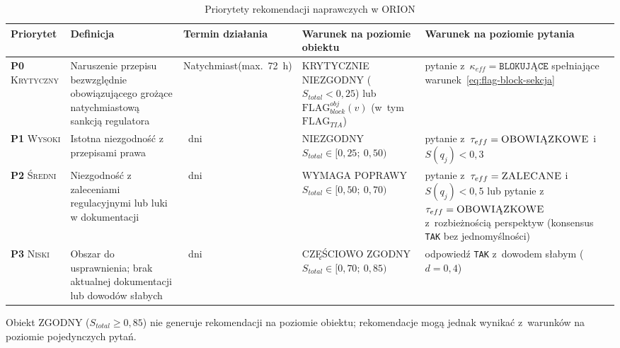 \begin{table}[H]
\centering
\caption{Priorytety rekomendacji naprawczych w ORION}
\label{tab:priorytety}
\renewcommand{\arraystretch}{1.5}
\begin{tabular}{>{\raggedright\arraybackslash}p{2.1cm}>{\raggedright\arraybackslash}p{3.4cm}>{\raggedright\arraybackslash}p{2.0cm}>{\raggedright\arraybackslash}p{3.3cm}>{\raggedright\arraybackslash}p{3.3cm}}
\toprule
\textbf{Priorytet} & \textbf{Definicja}
& \textbf{Termin działania}
& \textbf{Warunek na poziomie obiektu}
& \textbf{Warunek na poziomie pytania} \\
\midrule
\textbf{P0} \newline \textsc{Krytyczny}
& Naruszenie przepisu bezwzględnie obowiązującego
  grożące natychmiastową sankcją regulatora
& Natychmiast\newline(max.\ 72~h)
& \textsc{KRYTYCZNIE NIEZGODNY} ($S_{total} < 0{,}25$)
  lub $\text{FLAG}_{block}^{obj}(v)$ (w~tym $\text{FLAG}_{TIA}$)
& pytanie z~$\kappa_{eff} = \texttt{BLOKUJĄCE}$ spełniające
  warunek~\eqref{eq:flag-block-sekcja} \\
\midrule
\textbf{P1} \newline \textsc{Wysoki}
& Istotna niezgodność z przepisami prawa
& 30~dni
& \textsc{NIEZGODNY}\newline $S_{total} \in [0{,}25;\ 0{,}50)$
& pytanie z~$\tau_{eff} = \textsc{OBOWIĄZKOWE}$
  i~$S(q_j) < 0{,}3$ \\
\midrule
\textbf{P2} \newline \textsc{Średni}
& Niezgodność z zaleceniami regulacyjnymi
  lub luki w dokumentacji
& 90~dni
& \textsc{WYMAGA POPRAWY}\newline $S_{total} \in [0{,}50;\ 0{,}70)$
& pytanie z~$\tau_{eff} = \textsc{ZALECANE}$
  i~$S(q_j) < 0{,}5$ lub pytanie z~$\tau_{eff} = \textsc{OBOWIĄZKOWE}$
  z~rozbieżnością perspektyw (konsensus \texttt{TAK} bez jednomyślności) \\
\midrule
\textbf{P3} \newline \textsc{Niski}
& Obszar do usprawnienia;
  brak aktualnej dokumentacji lub dowodów słabych
& 180~dni
& \textsc{CZĘŚCIOWO ZGODNY}\newline $S_{total} \in [0{,}70;\ 0{,}85)$
& odpowiedź \texttt{TAK} z~dowodem słabym ($d = 0{,}4$) \\
\bottomrule
\end{tabular}
\end{table}

\noindent Obiekt \textsc{ZGODNY} ($S_{total} \geq 0{,}85$) nie generuje
rekomendacji na poziomie obiektu; rekomendacje mogą jednak wynikać
z~warunków na poziomie pojedynczych pytań.

